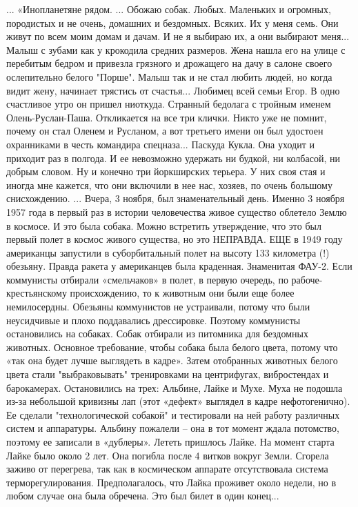 \obeycr
...
«Инопланетяне рядом.
...
Обожаю собак. Любых. Маленьких и огромных, породистых и не очень, домашних и бездомных. Всяких.
Их у меня семь. Они живут по всем моим домам и дачам. И не я выбираю их, а они выбирают меня...
Малыш с зубами как у крокодила средних размеров. Жена нашла его на улице с перебитым бедром и привезла грязного и дрожащего на дачу в салоне своего ослепительно белого "Порше". Малыш так и не стал любить людей, но когда видит жену, начинает трястись от счастья...
Любимец всей семьи Егор. В одно счастливое утро он пришел ниоткуда.
Странный бедолага с тройным именем Олень-Руслан-Паша. Откликается на все три клички. Никто уже не помнит, почему он стал Оленем и Русланом, а вот третьего имени он был удостоен охранниками в честь командира спецназа...
Паскуда Кукла. Она уходит и приходит раз в полгода. И ее невозможно удержать ни будкой, ни колбасой, ни добрым словом.
Ну и конечно три йоркширских терьера. У них своя стая и иногда мне кажется, что они включили в нее нас, хозяев, по очень большому снисхождению.
...
Вчера, 3 ноября, был знаменательный день. Именно 3 ноября 1957 года в первый раз в истории человечества живое существо облетело Землю в космосе. И это была собака. 
Можно встретить утверждение, что это был первый полет в космос живого существа, но это НЕПРАВДА. ЕЩЕ в 1949 году американцы запустили в суборбитальный полет на высоту 133 километра (!) обезьяну. 
Правда ракета у американцев была краденная. 
Знаменитая ФАУ-2.
Если коммунисты отбирали «смельчаков» в полет, в первую очередь, по рабоче-крестьянскому происхождению, то к животным они были еще более немилосердны. 
Обезьяны коммунистов не устраивали, потому что были неусидчивые и плохо поддавались дрессировке. 
Поэтому коммунисты остановились на собаках.
Собак отбирали из питомника для бездомных животных. Основное требование, чтобы собака была белого цвета, потому что «так она будет лучше выглядеть в кадре». 
Затем отобранных животных белого цвета стали "выбраковывать" тренировками на центрифугах, вибростендах и барокамерах. 
Остановились на трех: Альбине, Лайке и Мухе. Муха не подошла из-за небольшой кривизны лап (этот «дефект» выглядел в кадре нефотогенично). Ее сделали "технологической собакой" и тестировали на ней работу различных систем и аппаратуры.
Альбину пожалели – она в тот момент ждала потомство, поэтому ее записали в «дублеры».
Лететь пришлось Лайке. 
На момент старта Лайке было около 2 лет. Она погибла после 4 витков вокруг Земли. Сгорела заживо от перегрева, так как в космическом аппарате отсутствовала система терморегулирования. 
Предполагалось, что Лайка проживет около недели, но в любом случае она была обречена. Это был билет в один конец... 
